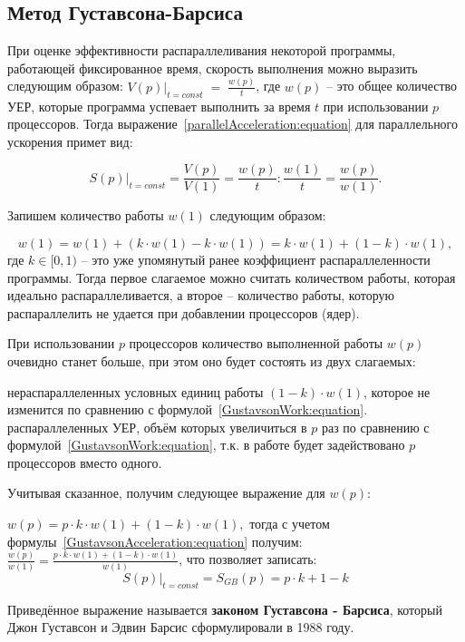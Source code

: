 \subsection{Метод Густавсона-Барсиса}

При оценке эффективности распараллеливания некоторой программы, работающей фиксированное время, скорость выполнения можно выразить следующим образом: $\left.V(p)\right|_{t=const}\;=\;\frac {w(p)}t$, где $w(p)$ – это общее количество УЕР, которые программа успевает выполнить за время $t$ при использовании $p$ процессоров. Тогда выражение~\eqref{parallelAcceleration:equation} для параллельного ускорения примет вид:

\begin{equation}
    \label{GustavsonAcceleration:equation}
    \left.S(p)\right|_{t=const} = \frac{V(p)}{V(1)} = \frac{w(p)}{t} : \frac{w(1)}{t} = \frac{w(p)}{w(1)}.
\end{equation}

Запишем количество работы $w(1)$ следующим образом:

\begin{equation}
    \label{GustavsonWork:equation}
    w(1) = w(1) + (k \cdot w(1) - k \cdot w(1)) = k \cdot w(1) + (1 - k) \cdot w(1),
\end{equation}
где $k\in[0,1)$ -- это уже упомянутый ранее коэффициент распараллеленности программы. Тогда первое слагаемое можно считать количеством работы, которая идеально распараллеливается, а второе – количество работы, которую распараллелить не удается при добавлении процессоров (ядер).

При использовании $p$ процессоров количество выполненной работы $w(p)$ очевидно станет больше, при этом оно  будет состоять из двух слагаемых: 

\begin{itemize}
     нераспараллеленных условных единиц работы $(1-k) \cdot w(1)$, которое не изменится по сравнению с формулой~\eqref{GustavsonWork:equation}.
     распараллеленных УЕР, объём которых увеличиться в $p$ раз по сравнению с формулой~\eqref{GustavsonWork:equation}, т.к. в работе будет задействовано $p$ процессоров вместо одного.
\end{itemize}

Учитывая сказанное, получим следующее выражение для $w(p)$:

$w(p) = p \cdot k \cdot w(1) + (1 - k) \cdot w(1),$ тогда с учетом формулы~\eqref{GustavsonAcceleration:equation} получим: $\frac{w(p)}{w(1)} = \frac{p \cdot k \cdot w(1) + (1 - k) \cdot w(1)}{w(1)}$, что позволяет записать:
\begin{equation}
    \left.S(p)\right|_{t=const} = S_{GB}(p) = p \cdot k + 1 - k
\end{equation}

Приведённое выражение называется \textbf{законом Густавсона - Барсиса}, который Джон Густавсон и Эдвин Барсис сформулировали в 1988 году. 
